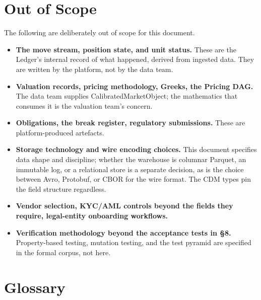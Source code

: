 \documentclass[11pt,a4paper]{article}
\begin{document}
\section{Out of Scope}

The following are deliberately out of scope for this document.

\begin{itemize}
\item \textbf{The move stream, position state, and unit status.} These are the Ledger's internal record of what happened, derived from ingested data. They are written by the platform, not by the data team.
\item \textbf{Valuation records, pricing methodology, Greeks, the Pricing DAG.} The data team supplies CalibratedMarketObject; the mathematics that consumes it is the valuation team's concern.
\item \textbf{Obligations, the break register, regulatory submissions.} These are platform-produced artefacts.
\item \textbf{Storage technology and wire encoding choices.} This document specifies data shape and discipline; whether the warehouse is columnar Parquet, an immutable log, or a relational store is a separate decision, as is the choice between Avro, Protobuf, or CBOR for the wire format. The CDM types pin the field structure regardless.
\item \textbf{Vendor selection, KYC/AML controls beyond the fields they require, legal-entity onboarding workflows.}
\item \textbf{Verification methodology beyond the acceptance tests in \S 8.} Property-based testing, mutation testing, and the test pyramid are specified in the formal corpus, not here.
\end{itemize}

\section{Glossary}
\end{document}
